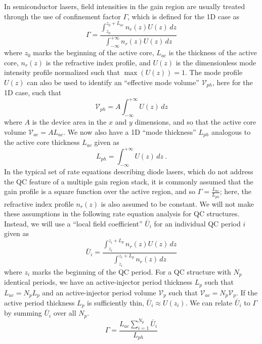 \documentclass[12pt]{report}
\begin{document}
{In semiconductor lasers, field intensities in the gain region are usually treated through the use of confinement factor $\Gamma$, which is defined for the 1D case as \cite{ColdrenCorzine}
\begin{equation}
\label{chpt1eqn:Gamma}
\Gamma = \frac{\int_{z_0}^{z_0+L_{ac}} \! n_r(z) U(z) \, dz}{\int_{-\infty}^{+\infty} \! n_r(z) U(z) \, dz}
\end{equation}
where $z_0$ marks the beginning of the active core, $L_{ac}$ is the thickness of the active core, $n_r(z)$ is the refractive index profile,
and $U(z)$ is the dimensionless mode intensity profile normalized such that $\max(U(z))=1$.  The mode profile $U(z)$ can also be used to identify an ``effective mode volume'' $\mathcal{V}_{ph}$, here for the 1D case, such that
\begin{equation}
\mathcal{V}_{ph} = A \int_{-\infty}^{+\infty} \! U(z) \, dz
\end{equation}
where $A$ is the device area in the $x$ and $y$ dimensions, and so that the active core volume $\mathcal{V}_{ac}=A L_{ac}$.  We now also have a 1D ``mode thickness'' $L_{ph}$ analogous to the active core thickness $L_{ac}$ given as
\begin{equation}
L_{ph} = \int_{-\infty}^{+\infty} \! U(z) \, dz {~.}
\end{equation}
In the typical set of rate equations describing diode lasers, which do not address the QC feature of a multiple gain region stack, it is commonly assumed that the gain profile is a square function over the active region, and so $\Gamma=\frac{L_{ac}}{L_{ph}}$; here, the refractive index profile $n_r(z)$ is also assumed to be constant.  We will not make these assumptions in the following rate equation analysis for QC structures.  Instead, we will use a ``local field coefficient'' $\bar{U}_i$ for an individual QC period $i$ given as
\begin{equation}
\bar{U}_i = \frac{\int_{z_i}^{z_i+L_{p}} \! n_r(z) U(z) \, dz}{\int_{z_i}^{z_i+L_p} \! n_r(z) \, dz}
\end{equation}
where $z_i$ marks the beginning of the QC period.  For a QC structure with $N_p$ identical periods, we have an active-injector period thickness $L_p$ such that $L_{ac}=N_p L_p$ and an active-injector period volume $\mathcal{V}_p$ such that $\mathcal{V}_{ac} = N_p \mathcal{V}_{p}$.  If the active period thickness $L_p$ is sufficiently thin, $\bar{U}_i\approx U(z_i)$.  We can relate $\bar{U}_i$ to $\Gamma$ by summing $\bar{U}_i$ over all $N_p$.
\begin{equation}
\label{chpt1eqn:barGamma}
\Gamma = \frac{L_{ac} \sum_{i=1}^{N_p} \bar{U}_i}{L_{ph}}
\end{equation}

}
\end{document}
